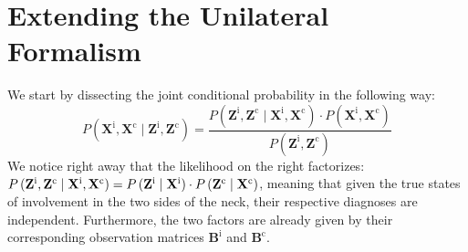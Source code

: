 \documentclass[\relativeRoot/main.tex]{subfiles}
\begin{document}
\section{Extending the Unilateral Formalism}
\label{sec:bilateral:expand}

We start by dissecting the joint conditional probability in the following way:
%
\begin{equation} \label{eq:hmm_bilateral_bayes}
    P \left( \mathbf{X}^\text{i}, \mathbf{X}^\text{c} \mid \mathbf{Z}^\text{i}, \mathbf{Z}^\text{c} \right) = \frac{P \left( \mathbf{Z}^\text{i}, \mathbf{Z}^\text{c} \mid \mathbf{X}^\text{i}, \mathbf{X}^\text{c} \right) \cdot P \left( \mathbf{X}^\text{i}, \mathbf{X}^\text{c} \right)}{P \left( \mathbf{Z}^\text{i}, \mathbf{Z}^\text{c} \right)}
\end{equation}
%
We notice right away that the likelihood on the right factorizes: $P \left( \mathbf{Z}^\text{i}, \mathbf{Z}^\text{c} \mid \mathbf{X}^\text{i}, \mathbf{X}^\text{c} \right) = P \left( \mathbf{Z}^\text{i} \mid \mathbf{X}^\text{i} \right) \cdot P \left( \mathbf{Z}^\text{c} \mid \mathbf{X}^\text{c} \right)$, meaning that given the true states of involvement in the two sides of the neck, their respective diagnoses are independent. Furthermore, the two factors are already given by their corresponding observation matrices $\mathbf{B}^\text{i}$ and $\mathbf{B}^\text{c}$.
\end{document}
